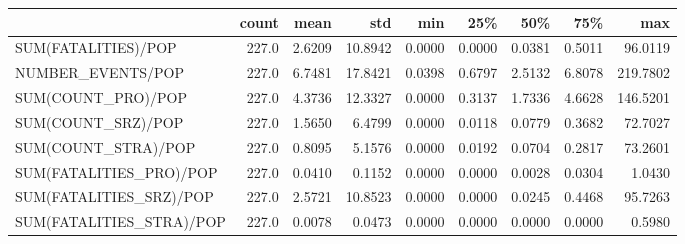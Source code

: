 \begin{tabular}{lrrrrrrrr}
\toprule
{} &  count &    mean &      std &     min &     25\% &     50\% &     75\% &       max \\
\midrule
SUM(FATALITIES)/POP      &  227.0 &  2.6209 &  10.8942 &  0.0000 &  0.0000 &  0.0381 &  0.5011 &   96.0119 \\
NUMBER\_EVENTS/POP        &  227.0 &  6.7481 &  17.8421 &  0.0398 &  0.6797 &  2.5132 &  6.8078 &  219.7802 \\
SUM(COUNT\_PRO)/POP       &  227.0 &  4.3736 &  12.3327 &  0.0000 &  0.3137 &  1.7336 &  4.6628 &  146.5201 \\
SUM(COUNT\_SRZ)/POP       &  227.0 &  1.5650 &   6.4799 &  0.0000 &  0.0118 &  0.0779 &  0.3682 &   72.7027 \\
SUM(COUNT\_STRA)/POP      &  227.0 &  0.8095 &   5.1576 &  0.0000 &  0.0192 &  0.0704 &  0.2817 &   73.2601 \\
SUM(FATALITIES\_PRO)/POP  &  227.0 &  0.0410 &   0.1152 &  0.0000 &  0.0000 &  0.0028 &  0.0304 &    1.0430 \\
SUM(FATALITIES\_SRZ)/POP  &  227.0 &  2.5721 &  10.8523 &  0.0000 &  0.0000 &  0.0245 &  0.4468 &   95.7263 \\
SUM(FATALITIES\_STRA)/POP &  227.0 &  0.0078 &   0.0473 &  0.0000 &  0.0000 &  0.0000 &  0.0000 &    0.5980 \\
\bottomrule
\end{tabular}
